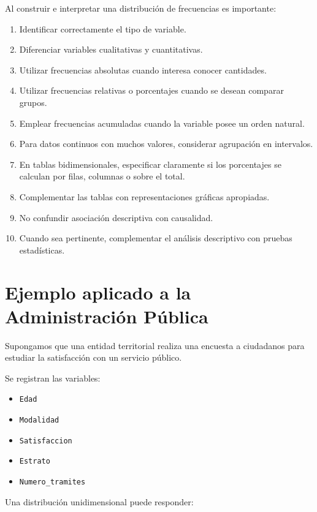 \documentclass[
  spanish,
  14pt,
  letterpaper,
  DIV=11,
  numbers=noendperiod]{scrartcl}
\providecommand{\tightlist}{%
  \setlength{\itemsep}{0pt}\setlength{\parskip}{0pt}}
\begin{document}
Al construir e interpretar una distribución de frecuencias es
importante:

\begin{enumerate}
\def\labelenumi{\arabic{enumi}.}
\tightlist
\item
  Identificar correctamente el tipo de variable.
\item
  Diferenciar variables cualitativas y cuantitativas.
\item
  Utilizar frecuencias absolutas cuando interesa conocer cantidades.
\item
  Utilizar frecuencias relativas o porcentajes cuando se desean comparar
  grupos.
\item
  Emplear frecuencias acumuladas cuando la variable posee un orden
  natural.
\item
  Para datos continuos con muchos valores, considerar agrupación en
  intervalos.
\item
  En tablas bidimensionales, especificar claramente si los porcentajes
  se calculan por filas, columnas o sobre el total.
\item
  Complementar las tablas con representaciones gráficas apropiadas.
\item
  No confundir asociación descriptiva con causalidad.
\item
  Cuando sea pertinente, complementar el análisis descriptivo con
  pruebas estadísticas.
\end{enumerate}

\section{Ejemplo aplicado a la Administración
Pública}\label{ejemplo-aplicado-a-la-administraciuxf3n-puxfablica}

Supongamos que una entidad territorial realiza una encuesta a ciudadanos
para estudiar la satisfacción con un servicio público.

Se registran las variables:

\begin{itemize}
\tightlist
\item
  \texttt{Edad}
\item
  \texttt{Modalidad}
\item
  \texttt{Satisfaccion}
\item
  \texttt{Estrato}
\item
  \texttt{Numero\_tramites}
\end{itemize}

Una distribución unidimensional puede responder:
\end{document}
